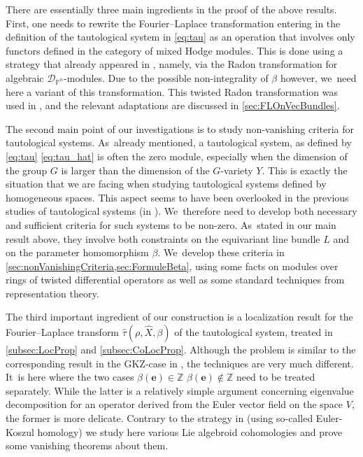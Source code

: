 \documentclass[JEP,XML,SOM,Unicode,published]{cedram}
\let\mathds\mathbb
\newcommand{\bme}{{\boldsymbol{e}}}
\newcommand{\dZ}{{\mathds Z}}\let\mbz\dZ\let\Z\dZ
\newcommand{\dP}{{\mathds P}}\let\P\dP
\begin{document}
There are essentially three main ingredients in the proof of the above results. First, one needs to rewrite the
Fourier--Laplace transformation entering in the definition of the tautological system in \eqref{eq:tau} as an operation that involves only functors defined in the category of mixed Hodge modules. This is done using a strategy that already appeared in \cite{Reich2}, namely, via the Radon transformation for algebraic $\mathscr{D}_{\dP^n}$\nobreakdash-mod\-ules.
Due to the possible non-integrality of $\beta$ however, we~need here a variant of this transformation.
This twisted Radon transformation was used in \cite[\S 5.2]{RS20}, and the relevant adaptations are discussed in \cref{sec:FLOnVecBundles}.

The second main point of our investigations is to study non-vanishing criteria for tautological systems. As~already mentioned, a tautological system, as defined by \eqref{eq:tau} \resp \eqref{eq:tau_hat} is often the zero module, especially when the dimension of the group $G$ is larger than the dimension of the $G$-variety $Y$. This is exactly the situation that we are facing when studying tautological systems defined by homogeneous spaces. This aspect seems to have been overlooked in the previous studies of tautological systems (\eg in \cite{Bloch_HolRankProb,HuangLianZhu}). We~therefore need to develop both necessary and sufficient criteria for such systems to be non-zero. As~stated in our main result above, they involve both constraints on the equivariant line bundle $L$ and on the parameter homomorphism $\beta$. We~develop these criteria in \cref{sec:nonVanishingCriteria,sec:FormuleBeta}, using some facts on modules over rings of twisted differential operators as well as some standard techniques from representation theory.

The third important ingredient of our construction is a localization result for the Fourier--Laplace transform $\hat{\tau}(\rho,\hat{X},\beta)$ of the tautological system, treated in \cref{subsec:LocProp} and \cref{subsec:CoLocProp}. Although the problem is similar to the corresponding result in the GKZ-case in \cite{SW09}, the techniques are very much different. It~is here where the two cases
$\beta(\bme)\in\dZ$ \resp $\beta(\bme)\notin\dZ$
need to be treated separately. While the latter is a relatively simple argument concerning eigenvalue decomposition for an operator derived from the Euler vector field on the space $V$, the former is more delicate. Contrary to the strategy in \cite{SW09} (using so-called Euler-Koszul homology) we study here various Lie algebroid cohomologies and prove some vanishing theorems about them.
\end{document}
